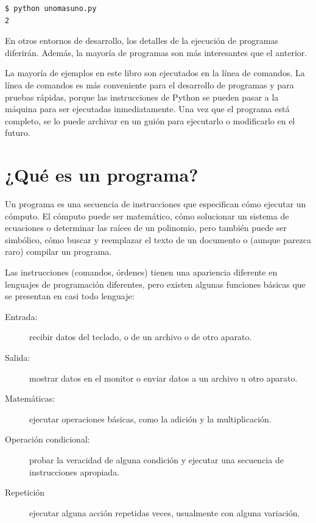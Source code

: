 \begin{verbatim}
$ python unomasuno.py
2
\end{verbatim}

En otros entornos de desarrollo, los detalles de la ejecución de
programas diferirán. Además, la mayoría de programas son más
interesantes que el anterior.

La mayoría de ejemplos en este libro son ejecutados en la línea de
comandos. La línea de comandos es más conveniente para el desarrollo de
programas y para pruebas rápidas, porque las instrucciones de Python 
se pueden pasar a la máquina para ser ejecutadas inmediatamente. 
Una vez que el programa está completo, se lo puede
archivar en un guión para ejecutarlo o modificarlo en el futuro.

\section{¿Qué es un programa?}

Un programa es una secuencia de instrucciones que especifican cómo
ejecutar un cómputo. El cómputo puede ser 
matemático, cómo solucionar un sistema de ecuaciones o determinar
las raíces de un polinomio, pero también puede ser 
simbólico, cómo buscar y reemplazar el texto de un
documento o (aunque parezca raro) compilar un programa.


Las instrucciones (comandos, órdenes) tienen una apariencia
diferente en lenguajes de programación diferentes, pero existen
algunas funciones básicas que se presentan en casi todo lenguaje:

\begin{description}

\item[Entrada:] recibir datos del teclado, o de un archivo o de otro
aparato.

\item[Salida:] mostrar datos en el monitor o enviar datos a un
archivo u otro aparato.

\item[Matemáticas:] ejecutar operaciones básicas, como la adición y la multiplicación.

\item[Operación condicional:] probar la veracidad de alguna
condición y ejecutar una secuencia de instrucciones apropiada.

\item[Repetición] ejecutar alguna acción repetidas veces,
usualmente con alguna variación.

\end{description}

